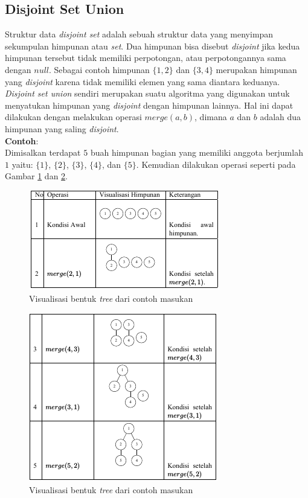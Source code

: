 \documentclass[a4paper]{IEEEtran}
\begin{document}
\subsection{Disjoint Set Union}
\quad Struktur data \textit{disjoint set} adalah sebuah struktur data yang menyimpan sekumpulan himpunan atau \textit{set}. Dua himpunan bisa disebut \textit{disjoint} jika kedua himpunan tersebut tidak memiliki perpotongan, atau perpotongannya sama dengan $\textit{null}$. Sebagai contoh himpunan $\{1,2\}$ dan $\{3,4\}$ merupakan himpunan yang \textit{disjoint} karena tidak memiliki elemen yang sama diantara keduanya.\\
\textit{Disjoint set union} sendiri merupakan suatu algoritma yang digunakan untuk menyatukan himpunan yang \textit{disjoint} dengan himpunan lainnya. Hal ini dapat dilakukan dengan melakukan operasi \textit{$merge(a,b)$}, dimana $a$ dan $b$ adalah dua himpunan yang saling \textit{disjoint}.\\
\textbf{Contoh}:\\
\quad Dimisalkan terdapat $5$ buah himpunan bagian yang memiliki anggota berjumlah $1$ yaitu: $\{1\}$, $\{2\}$, $\{3\}$, $\{4\}$, dan $\{5\}$. Kemudian dilakukan operasi seperti pada Gambar \ref{figure:visdsu1} dan \ref{figure:visdsu2}.\\
\begin{figure}[H]
	\centerline{ \includegraphics[scale=0.5]{images/tabel1.png}}
	\caption{Visualisasi bentuk \textit{tree} dari contoh masukan}
	\label{figure:visdsu1}
\end{figure}
\begin{figure}
	\centerline{ \includegraphics[scale=0.5]{images/tabel2.png}}
	\caption{Visualisasi bentuk \textit{tree} dari contoh masukan}
	\label{figure:visdsu2}
\end{figure}
\end{document}
